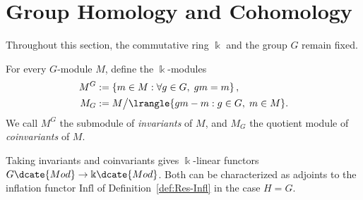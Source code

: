 
\section{Group Homology and Cohomology}\label{sec:group-coh-sub}
\hypertarget{o014.aljabr2.chapter6.group-homology-cohomology}{ }
Throughout this section, the commutative ring $\Bbbk$ and the group $G$ remain
fixed.

\begin{definition}
	For every $G$-module $M$, define the $\Bbbk$-modules
	\begin{align*}
		M^G & := \left\{ m \in M : \forall g \in G, \; gm = m \right\}, \\
		M_G & := M \big/ \lrangle{gm - m : g \in G, \; m \in M}.
	\end{align*}
	We call $M^G$ the submodule of \emph{invariants} of $M$, and $M_G$ the
	quotient module of \emph{coinvariants} of $M$.
\end{definition}

Taking invariants and coinvariants gives $\Bbbk$-linear functors
$G\dcate{Mod}\to\Bbbk\dcate{Mod}$. Both can be characterized as adjoints to
the inflation functor $\mathrm{Infl}$ of Definition~\ref{def:Res-Infl} in the
case $H=G$.

